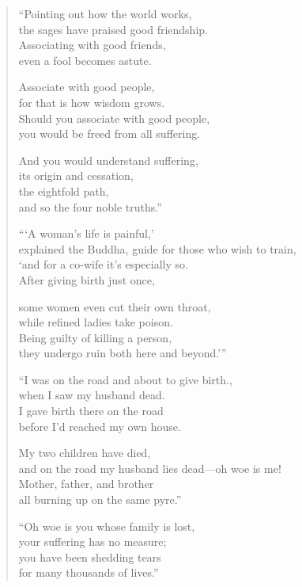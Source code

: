 \documentclass[12pt,openany]{book}%
\begin{document}
\begin{verse}%
“Pointing out how the world works, \\
the sages have praised good friendship. \\
Associating with good friends, \\
even a fool becomes astute. 

Associate with good people, \\
for that is how wisdom grows. \\
Should you associate with good people, \\
you would be freed from all suffering. 

And you would understand suffering, \\
its origin and cessation, \\
the eightfold path, \\
and so the four noble truths.” 

“‘A woman’s life is painful,’ \\
explained the Buddha, guide for those who wish to train, \\
‘and for a co-wife it’s especially so. \\
After giving birth just once, 

some women even cut their own throat, \\
while refined ladies take poison. \\
Being guilty of killing a person, \\
they undergo ruin both here and beyond.’” 

“I was on the road and about to give birth., \\
when I saw my husband dead. \\
I gave birth there on the road \\
before I’d reached my own house. 

My two children have died, \\
and on the road my husband lies dead—oh woe is me! \\
Mother, father, and brother \\
all burning up on the same pyre.” 

“Oh woe is you whose family is lost, \\
your suffering has no measure; \\
you have been shedding tears \\
for many thousands of lives.” 


\end{verse}
\end{document}

